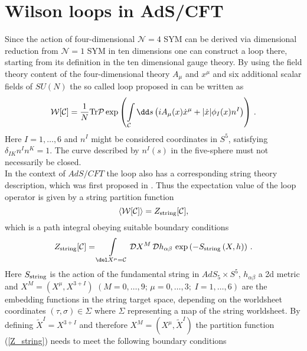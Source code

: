 \section{Wilson loops in AdS/CFT}
Since the action of four-dimensional $\mathcal{N}=4$ SYM can be derived via dimensional reduction from $\mathcal{N}=1$ SYM in ten dimensions \cite{BRINK197777} one can construct a  loop there, starting from its definition in the ten dimensional gauge theory. By using the field theory content of the four-dimensional theory $A_{\mu}$ and $x^{\mu}$ and six additional scalar fields of $SU(N)$ the so called  loop proposed in \cite{maldacena2} can be written as
%
%
\begin{equation}
\mathcal{W}[\mathcal{C}] = \frac{1}{N}{\rm Tr}\mathcal{P} \exp \left( \int\limits_{\mathcal{C}} \dd s \left( i A_{\mu}(x)\dot{x}^{\mu} +
\vert \dot{x}\vert \phi_{I}(x) n^{I} \right) \right) \,.
\end{equation}
%
%
Here $I=1,\ldots,6$ and $n^{I}$ might be considered coordinates in $S^{5}$, satisfying $\delta_{IK}n^{I}n^{K}=1$. The curve described by $n^{I}(s)$ in the five-sphere must not necessarily be closed. \\
%
%
In the context of $AdS/CFT$ the  loop also has a corresponding string theory description, which was first proposed in \cite{maldacena2}. Thus the expectation value of the  loop operator is given by a string partition function
%
%
\begin{equation}
\langle \mathcal{W}[\mathcal{C}]\rangle = Z_{\rm string}[\mathcal{C}],
\label{W_Z}
\end{equation}
%
%
which is a path integral obeying suitable boundary conditions
%
%
\begin{equation}
Z_{\rm string}[\mathcal{C}] = \int\limits_{\del X^{\mu}=\mathcal{C}} \mathcal{D}X^{M}\, \mathcal{D}h_{\alpha\beta}\, \exp \left(-S_{\rm string}\left( X,h \right) \right)\,.
\label{Z_string}
\end{equation}
%
%
Here $S_{\rm string}$ is the action of the fundamental string in $AdS_{5}\times S^{5}$, $h_{\alpha\beta}$ a 2d metric and ${X^{M}=(X^{\mu},X^{3+I})}$ ${(M=0,\ldots,9;\, \mu=0,\ldots,3; \; I=1,\ldots,6)}$ are the embedding functions in the string target space, depending on the worldsheet coordinates $(\tau,\sigma)\in \Sigma$ where $\Sigma$ representing a map of the string worldsheet. By defining $\widetilde{X}^{I}=X^{3+I}$ and therefore $X^{M}=(X^{\mu},\widetilde{X}^{I})$ the partition function (\ref{Z_string}) needs to meet the following boundary conditions
